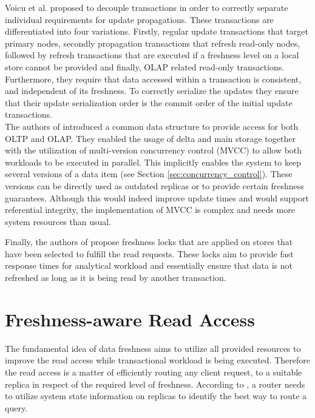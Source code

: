 Voicu et al. \cite{voicu:2010} proposed to decouple transactions in order to correctly separate individual requirements for update propagations.
These transactions are differentiated into four variations. Firstly, regular update transactions that target primary nodes, secondly propagation transactions 
that refresh read-only nodes, followed by refresh transactions that are executed if a freshness level on a local store cannot be provided and 
finally, OLAP related read-only transactions.
Furthermore, they require that data accessed within a transaction is consistent, and independent of its freshness. To correctly serialize the updates
they ensure that their update serialization order is the commit order of the initial update transactions.\\
The authors of \cite{psaroudakis:2015} introduced a common data structure to provide access for both OLTP and OLAP. 
They enabled the usage of delta and main storage together with the utilization of multi-version concurrency control (MVCC) to allow both workloads to be executed in parallel.
This implicitly enables the system to keep several versions of a data item (see Section \ref{sec:concurrency_control}).
These versions can be directly used as outdated replicas or to provide certain freshness guarantees.
Although this would indeed improve update times and would support referential integrity, the implementation of MVCC is complex and needs more system resources than usual.

Finally, the authors of \cite{akal:2005} propose freshness locks that are applied on stores that have been selected to fulfill the read requests. 
These locks aim to provide fast response times for analytical workload and essentially ensure that data is not refreshed as long as it is being read by another transaction.



\section{Freshness-aware Read Access}
\label{r:read}
The fundamental idea of data freshness aims to utilize all provided resources to improve the read access while transactional workload is being executed.
Therefore the read access is a matter of efficiently routing any client request, to a suitable replica in respect of the required level of freshness.
According to \cite{rohm:2002, akal:2005}, a router needs to utilize system state information on replicas to identify the best way to route a query.

